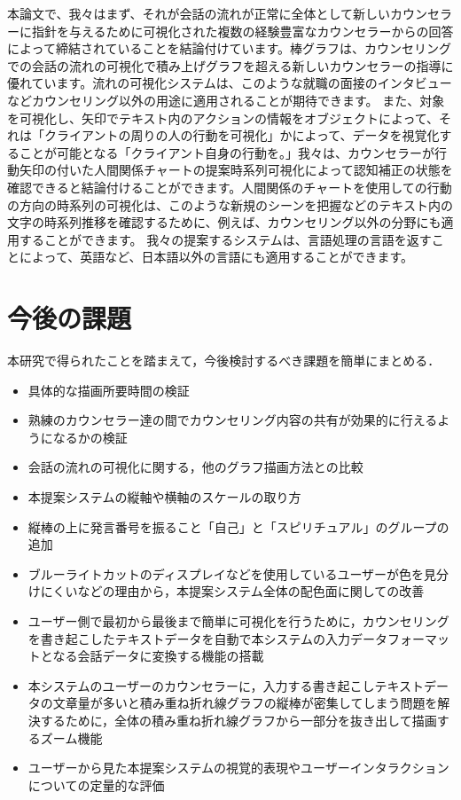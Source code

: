 \documentclass[shuuron]{kuee}
\begin{document}

本論文で、我々はまず、それが会話の流れが正常に全体として新しいカウンセラーに指針を与えるために可視化された複数の経験豊富なカウンセラーからの回答によって締結されていることを結論付けています。棒グラフは、カウンセリングでの会話の流れの可視化で積み上げグラフを超える新しいカウンセラーの指導に優れています。流れの可視化システムは、このような就職の面接のインタビューなどカウンセリング以外の用途に適用されることが期待できます。
  また、対象を可視化し、矢印でテキスト内のアクションの情報をオブジェクトによって、それは「クライアントの周りの人の行動を可視化」かによって、データを視覚化することが可能となる「クライアント自身の行動を。」我々は、カウンセラーが行動矢印の付いた人間関係チャートの提案時系列可視化によって認知補正の状態を確認できると結論付けることができます。人間関係のチャートを使用しての行動の方向の時系列の可視化は、このような新規のシーンを把握などのテキスト内の文字の時系列推移を確認するために、例えば、カウンセリング以外の分野にも適用することができます。
    我々の提案するシステムは、言語処理の言語を返すことによって、英語など、日本語以外の言語にも適用することができます。



\section{今後の課題}

本研究で得られたことを踏まえて，今後検討するべき課題を簡単にまとめる．

\begin{itemize}
\item 具体的な描画所要時間の検証
\item 熟練のカウンセラー達の間でカウンセリング内容の共有が効果的に行えるようになるかの検証
\item 会話の流れの可視化に関する，他のグラフ描画方法との比較
\item 本提案システムの縦軸や横軸のスケールの取り方
\item 縦棒の上に発言番号を振ること「自己」と「スピリチュアル」のグループの追加
\item ブルーライトカットのディスプレイなどを使用しているユーザーが色を見分けにくいなどの理由から，本提案システム全体の配色面に関しての改善
\item ユーザー側で最初から最後まで簡単に可視化を行うために，カウンセリングを書き起こしたテキストデータを自動で本システムの入力データフォーマットとなる会話データに変換する機能の搭載
\item 本システムのユーザーのカウンセラーに，入力する書き起こしテキストデータの文章量が多いと積み重ね折れ線グラフの縦棒が密集してしまう問題を解決するために，全体の積み重ね折れ線グラフから一部分を抜き出して描画するズーム機能
\item ユーザーから見た本提案システムの視覚的表現やユーザーインタラクションについての定量的な評価
\end{itemize}
\end{document}
